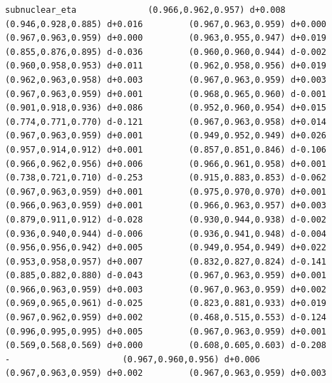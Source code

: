 \documentclass[11pt, letterpaper, openany]{book}
\begin{document}
\begin{empiricalbox}
\begin{lstlisting}[style=terminal]
subnuclear_eta              (0.966,0.962,0.957) d+0.008         (0.946,0.928,0.885) d+0.016         (0.967,0.963,0.959) d+0.000         (0.967,0.963,0.959) d+0.000         (0.963,0.955,0.947) d+0.019         (0.855,0.876,0.895) d-0.036         (0.960,0.960,0.944) d-0.002         (0.960,0.958,0.953) d+0.011         (0.962,0.958,0.956) d+0.019         (0.962,0.963,0.958) d+0.003         (0.967,0.963,0.959) d+0.003         (0.967,0.963,0.959) d+0.001         (0.968,0.965,0.960) d-0.001         (0.901,0.918,0.936) d+0.086         (0.952,0.960,0.954) d+0.015         (0.774,0.771,0.770) d-0.121         (0.967,0.963,0.958) d+0.014         (0.967,0.963,0.959) d+0.001         (0.949,0.952,0.949) d+0.026         (0.957,0.914,0.912) d+0.001         (0.857,0.851,0.846) d-0.106         (0.966,0.962,0.956) d+0.006         (0.966,0.961,0.958) d+0.001         (0.738,0.721,0.710) d-0.253         (0.915,0.883,0.853) d-0.062         (0.967,0.963,0.959) d+0.001         (0.975,0.970,0.970) d+0.001         (0.966,0.963,0.959) d+0.001         (0.966,0.963,0.957) d+0.003         (0.879,0.911,0.912) d-0.028         (0.930,0.944,0.938) d-0.002         (0.936,0.940,0.944) d-0.006         (0.936,0.941,0.948) d-0.004         (0.956,0.956,0.942) d+0.005         (0.949,0.954,0.949) d+0.022         (0.953,0.958,0.957) d+0.007         (0.832,0.827,0.824) d-0.141         (0.885,0.882,0.880) d-0.043         (0.967,0.963,0.959) d+0.001         (0.966,0.963,0.959) d+0.003         (0.967,0.963,0.959) d+0.002         (0.969,0.965,0.961) d-0.025         (0.823,0.881,0.933) d+0.019         (0.967,0.962,0.959) d+0.002         (0.468,0.515,0.553) d-0.124         (0.996,0.995,0.995) d+0.005         (0.967,0.963,0.959) d+0.001         (0.569,0.568,0.569) d+0.000         (0.608,0.605,0.603) d-0.208                      -                      (0.967,0.960,0.956) d+0.006         (0.967,0.963,0.959) d+0.002         (0.967,0.963,0.959) d+0.003     

\end{lstlisting}
\end{empiricalbox}
\end{document}
